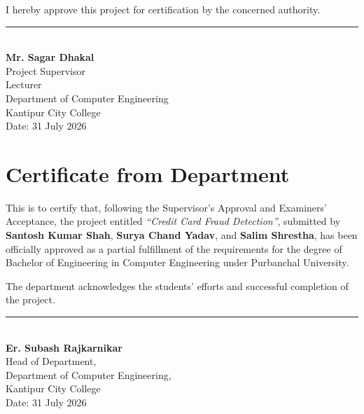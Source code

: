 \documentclass[12pt,a4paper]{report}
\newcommand{\projecttitle}{Credit Card Fraud Detection}
\newcommand{\department}{Department of Computer Engineering}
\newcommand{\college}{Kantipur City College}
\begin{document}
I hereby approve this project for certification by the concerned authority.

\vspace{1.5cm}
{\singlespacing
\noindent\rule{5cm}{0.4pt}\\[0.2cm]
\textbf{Mr. Sagar Dhakal}\\
Project Supervisor\\
Lecturer\\
Department of Computer Engineering\\
Kantipur City College\\[0.3cm]
Date: 31 July 2026
\par}

\newpage

\chapter*{Certificate from Department}

This is to certify that, following the Supervisor's Approval and Examiners' Acceptance, the project entitled \textit{``\projecttitle''}, submitted by \textbf{Santosh Kumar Shah}, \textbf{Surya Chand Yadav}, and \textbf{Salim Shrestha}, has been officially approved as a partial fulfillment of the requirements for the degree of Bachelor of Engineering in Computer Engineering under Purbanchal University.

The department acknowledges the students' efforts and successful completion of the project.

\vspace{2cm}
{\singlespacing
\noindent\rule{5cm}{0.4pt}\\[0.2cm]
\textbf{Er. Subash Rajkarnikar}\\
Head of Department,\\
\department,\\
\college\\[0.3cm]
Date: 31 July 2026
\par}

\newpage

\tableofcontents
\newpage

\begingroup
\makeatletter
\let\addvspace\@gobble
\makeatother
\listoffigures
\endgroup
\newpage

\begingroup
\makeatletter
\let\addvspace\@gobble
\makeatother
\listoftables
\endgroup
\newpage
\end{document}
